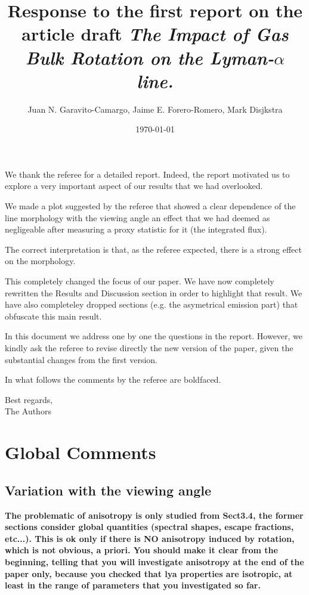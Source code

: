 \documentclass[12pt]{article}
\title{Response to the first report on the article draft \emph{The
    Impact of Gas Bulk Rotation on the Lyman-$\alpha$ line.}}
\author{Juan N. Garavito-Camargo, Jaime E. Forero-Romero, Mark Disjkstra}
\date{\today}
\begin{document}
\maketitle
We thank the referee for a detailed report. Indeed, the report
motivated us to explore a very important aspect of our results that we
had overlooked.  

We made a plot suggested by the referee that showed a clear
dependence of the line morphology with the viewing angle an effect
that we had deemed as negligeable after measuring a proxy statistic for
it (the integrated flux).

The correct interpretation is that, as the referee expected, there is
a strong effect on the morphology. 

This completely changed the focus of our paper. We have now completely
rewritten the Results and Discussion section in order to highlight
that result. We have also completeley dropped sections (e.g. the
asymetrical emission part) that obfuscate this main result.

In this document we address one by one the questions in the
report. However, we kindly ask the referee to revise directly the new
version of the paper, given the substantial changes from the first
version.


In what follows the comments by the referee are boldfaced.

Best regards, \\

The Authors\\




\section{Global Comments}

\subsection{Variation with the viewing angle}

{\bf The problematic of anisotropy is only studied from Sect3.4, the former
sections consider global quantities (spectral shapes, escape
fractions, etc...). This is ok only if there is NO anisotropy induced
by rotation, which is not obvious, a priori. You should make it clear
from the beginning, telling that you will investigate anisotropy at
the end of the paper only, because you checked that lya properties are
isotropic, at least in the range of parameters that you investigated
so far.}
\end{document}
